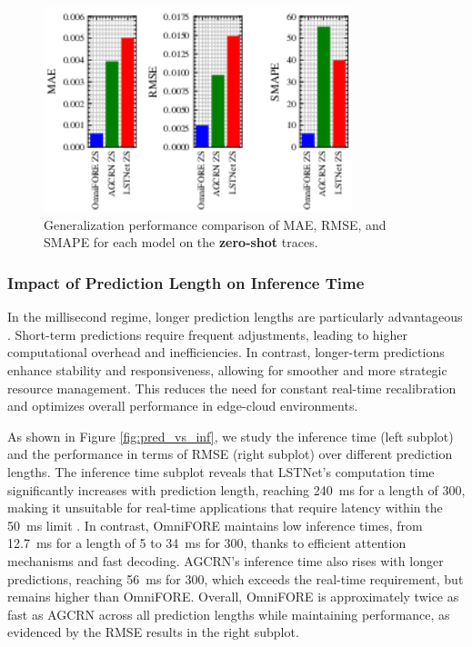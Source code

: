 \documentclass{ieeetmlcn}
\begin{document}
\begin{figure}\centering
\centering
\centering\includegraphics[width=0.8\textwidth]{img/metrics_comparison_zs.png}
\caption{Generalization performance comparison of MAE, RMSE, and SMAPE for each model on the \textbf{zero-shot} traces.}
\label{fig:metrics_comparison_ZS}
\end{figure}


\subsubsection{\textbf{Impact of Prediction Length on Inference Time}}

In the millisecond regime, longer prediction lengths are particularly advantageous \cite{9500858}. Short-term predictions require frequent adjustments, leading to higher computational overhead and inefficiencies. In contrast, longer-term predictions enhance stability and responsiveness, allowing for smoother and more strategic resource management. This reduces the need for constant real-time recalibration and optimizes overall performance in edge-cloud environments.

As shown in Figure \ref{fig:pred_vs_inf}, we study the inference time (left subplot) and the performance in terms of RMSE (right subplot) over different prediction lengths. The inference time subplot reveals that LSTNet's computation time significantly increases with prediction length, reaching \SI{240}{\milli\second} for a length of 300, making it unsuitable for real-time applications that require latency within the \SI{50}{\milli\second} limit \cite{8334540}. In contrast, OmniFORE maintains low inference times, from \SI{12.7}{\milli\second} for a length of 5 to \SI{34}{\milli\second} for 300, thanks to efficient attention mechanisms and fast decoding. AGCRN's inference time also rises with longer predictions, reaching \SI{56}{\milli\second} for 300, which exceeds the real-time requirement, but remains higher than OmniFORE. Overall, OmniFORE is approximately twice as fast as AGCRN across all prediction lengths while maintaining performance, as evidenced by the RMSE results in the right subplot.
\end{document}

